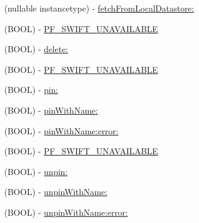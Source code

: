 \begin{DoxyCompactItemize}
\begin{DoxyCompactList}
 \end{DoxyCompactList}\item 
(nullable instancetype) -\/ \hyperlink{category_p_f_object_07_synchronous_08_a6e07bdad46a1242e0ca21bc8c864b074}{fetch\+From\+Local\+Datastore\+:}
\item 
(B\+O\+O\+L) -\/ \hyperlink{category_p_f_object_07_synchronous_08_adbd353cd498462b7749c7a2ad0d745d0}{P\+F\+\_\+\+S\+W\+I\+F\+T\+\_\+\+U\+N\+A\+V\+A\+I\+L\+A\+B\+L\+E}
\begin{DoxyCompactList}\small\item\em 

 \end{DoxyCompactList}\item 
(B\+O\+O\+L) -\/ \hyperlink{category_p_f_object_07_synchronous_08_a275e27c04d747f626dabcb618298e149}{delete\+:}
\item 
(B\+O\+O\+L) -\/ \hyperlink{category_p_f_object_07_synchronous_08_adbd353cd498462b7749c7a2ad0d745d0}{P\+F\+\_\+\+S\+W\+I\+F\+T\+\_\+\+U\+N\+A\+V\+A\+I\+L\+A\+B\+L\+E}
\begin{DoxyCompactList}\small\item\em 

 \end{DoxyCompactList}\item 
(B\+O\+O\+L) -\/ \hyperlink{category_p_f_object_07_synchronous_08_a0ed73b08b70ced7cedc6b8c2993d1937}{pin\+:}
\item 
(B\+O\+O\+L) -\/ \hyperlink{category_p_f_object_07_synchronous_08_a25909ad50643cdb1d6558dbe04fb1a7d}{pin\+With\+Name\+:}
\item 
(B\+O\+O\+L) -\/ \hyperlink{category_p_f_object_07_synchronous_08_a99b147c524b8e00861636660c5b00db1}{pin\+With\+Name\+:error\+:}
\item 
(B\+O\+O\+L) -\/ \hyperlink{category_p_f_object_07_synchronous_08_adbd353cd498462b7749c7a2ad0d745d0}{P\+F\+\_\+\+S\+W\+I\+F\+T\+\_\+\+U\+N\+A\+V\+A\+I\+L\+A\+B\+L\+E}
\begin{DoxyCompactList}\small\item\em 

 \end{DoxyCompactList}\item 
(B\+O\+O\+L) -\/ \hyperlink{category_p_f_object_07_synchronous_08_a25de4ace661e9634ef79586b5207c874}{unpin\+:}
\item 
(B\+O\+O\+L) -\/ \hyperlink{category_p_f_object_07_synchronous_08_aa58a44ec55fc92a6e206c894795c59e9}{unpin\+With\+Name\+:}
\item 
(B\+O\+O\+L) -\/ \hyperlink{category_p_f_object_07_synchronous_08_afaada7851ee75c8d64599c682415bc05}{unpin\+With\+Name\+:error\+:}
\end{DoxyCompactItemize}
